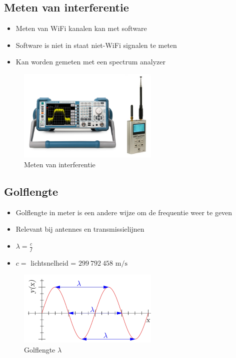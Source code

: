 \documentclass{article}
\begin{document}
\subsection{Meten van interferentie}
\begin{itemize}
    \item Meten van WiFi kanalen kan met software 
    \item Software is niet in staat niet-WiFi signalen te meten
    \item Kan worden gemeten met een spectrum analyzer
\end{itemize}

\begin{figure}[H]
    \centering
    \includegraphics[width=0.6\textwidth]{Screenshot_20200309_120748.png}
    \caption{Meten van interferentie}
\end{figure}

\subsection{Golflengte}
\begin{itemize}
    \item Golflengte in meter is een andere wijze om de frequentie weer te geven
    \item Relevant bij antennes en transmissielijnen
    \item $\lambda = \frac{c}{f}$
    \item $c=$ lichtsnelheid = $299\ 792\ 458 \text{ m/s}$ 
\end{itemize}

\begin{figure}[H]
    \centering
    \includegraphics[width=0.6\textwidth]{Screenshot_20200309_121003.png}
    \caption{Golflengte $\lambda$}
\end{figure}
\end{document}
